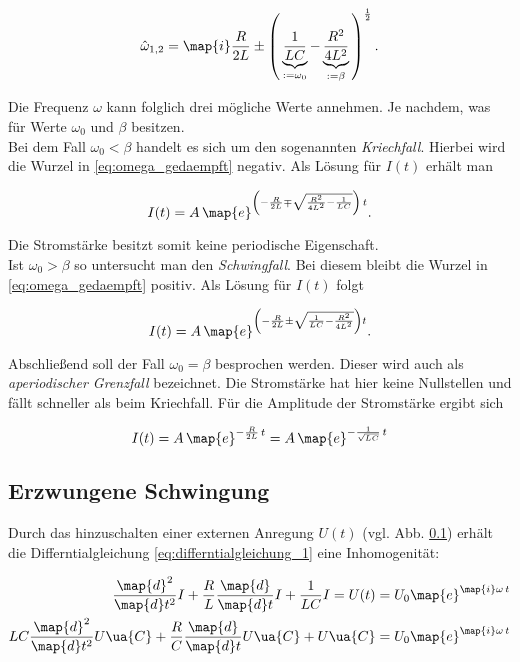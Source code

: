 \begin{equation}
  \label{eq:omega_gedaempft}
  \hat{\omega}_{1,2}=\map{i}\frac{R}{2L}\pm\left(\,\underbrace{\frac{1}{LC}}_{:=\omega_0}-\underbrace{\frac{R^2}{4L^2}}_{:=\beta}\,\right)^{\frac{1}{2}}.
\end{equation}

 Die Frequenz $\omega$ kann folglich drei mögliche Werte annehmen.
 Je nachdem, was für Werte $\omega_0$ und $\beta$ besitzen.
\\

Bei dem Fall $\omega_0<\beta$ handelt es sich um den sogenannten \emph{Kriechfall}.
 Hierbei wird die Wurzel in \eqref{eq:omega_gedaempft} negativ. Als Lösung für
 $I(t)$ erhält man

\begin{equation*}
     I(t)=A\,\map{e}^{\left(-\frac{R}{2L}\mp\sqrt{\frac{R^2}{4L^2}-\frac{1}{LC}}\right)\,t}.
\end{equation*}

Die Stromstärke besitzt somit keine periodische Eigenschaft.
\\

Ist $\omega_0>\beta$ so untersucht man den \emph{Schwingfall}.
Bei diesem bleibt die Wurzel in \eqref{eq:omega_gedaempft} positiv. Als
Lösung für $I(t)$ folgt

\begin{equation*}
  I(t)=A\,\map{e}^{\left(-\frac{R}{2L}\pm\sqrt{{\frac{1}{LC}}-\frac{R^2}{4L^2}}\right)t}.
\end{equation*}

Abschließend soll der Fall $\omega_0=\beta$ besprochen werden.
Dieser wird auch als \emph{aperiodischer Grenzfall} bezeichnet.
Die Stromstärke hat hier keine Nullstellen und fällt schneller als
beim Kriechfall.
Für die Amplitude der Stromstärke ergibt sich

\begin{equation}
  \label{eq:ap_grenz}
  I(t)=A\,\map{e}^{-\frac{R}{2L}\,t}=A\,\map{e}^{-\frac{1}{\sqrt{LC}}\,t}
\end{equation}

\subsection{Erzwungene Schwingung}

Durch das hinzuschalten einer externen Anregung $U(t)$ (vgl. Abb. \ref{})
erhält die Differntialgleichung \eqref{eq:differntialgleichung_1} eine
Inhomogenität:

\begin{align}
  \frac{\map{d}^2}{\map{d}t^2}I+\frac{R}{L}\frac{\map{d}}{\map{d}t}I+\frac{1}{LC}I=U(t)&=U_0\map{e}^{\map{i}\omega\, t}\notag \\
  LC\frac{\map{d}^2}{\map{d}t^2}U\ua{C}+\frac{R}{C}\frac{\map{d}}{\map{d}t}U\ua{C}+U\ua{C}&=U_0\map{e}^{\map{i}\omega\, t} \label{eq:dgl_2}
\end{align}

